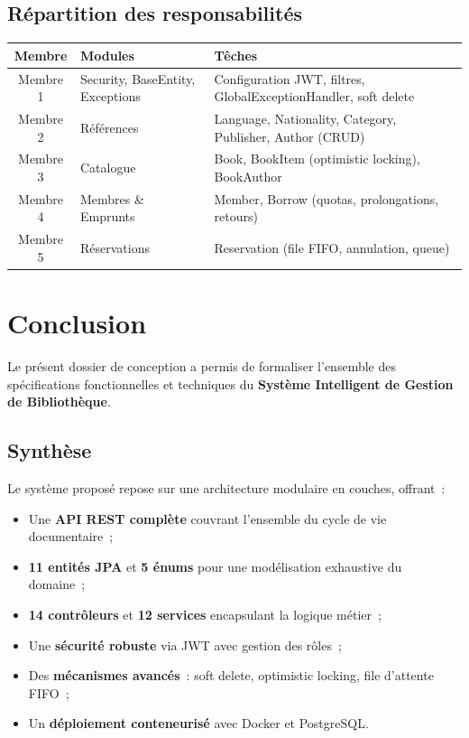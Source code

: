 \documentclass[12pt,a4paper]{article}
\newcommand{\tableheader}[1]{%
  \cellcolor{navy}\color{white}\bfseries #1%
}
\begin{document}
\subsection{R\'epartition des responsabilit\'es}
\begin{center}
\begin{tabularx}{\textwidth}{|c|X|X|}
\hline
\tableheader{Membre} & \tableheader{Modules} & \tableheader{T\^eches} \\
\hline
Membre 1 & Security, BaseEntity, Exceptions & Configuration JWT, filtres, GlobalExceptionHandler, soft delete \\
Membre 2 & R\'ef\'erences & Language, Nationality, Category, Publisher, Author (CRUD) \\
Membre 3 & Catalogue & Book, BookItem (optimistic locking), BookAuthor \\
Membre 4 & Membres \& Emprunts & Member, Borrow (quotas, prolongations, retours) \\
Membre 5 & R\'eservations & Reservation (file FIFO, annulation, queue) \\
\hline
\end{tabularx}
\end{center}

\newpage
\section{Conclusion}

Le pr\'esent dossier de conception a permis de formaliser l'ensemble des sp\'ecifications fonctionnelles et techniques du \textbf{Syst\`eme Intelligent de Gestion de Biblioth\`eque}.

\subsection{Synth\`ese}
Le syst\`eme propos\'e repose sur une architecture modulaire en couches, offrant~:
\begin{itemize}[leftmargin=1.5em, label=\textcolor{navy}{$\bullet$}]
  \item Une \textbf{API REST compl\`ete} couvrant l'ensemble du cycle de vie documentaire~;
  \item \textbf{11 entit\'es JPA} et \textbf{5 \'enums} pour une mod\'elisation exhaustive du domaine~;
  \item \textbf{14 contr\^oleurs} et \textbf{12 services} encapsulant la logique m\'etier~;
  \item Une \textbf{s\'ecurit\'e robuste} via JWT avec gestion des r\^oles~;
  \item Des \textbf{m\'ecanismes avanc\'es}~: soft delete, optimistic locking, file d'attente FIFO~;
  \item Un \textbf{d\'eploiement conteneuris\'e} avec Docker et PostgreSQL.
\end{itemize}
\end{document}
